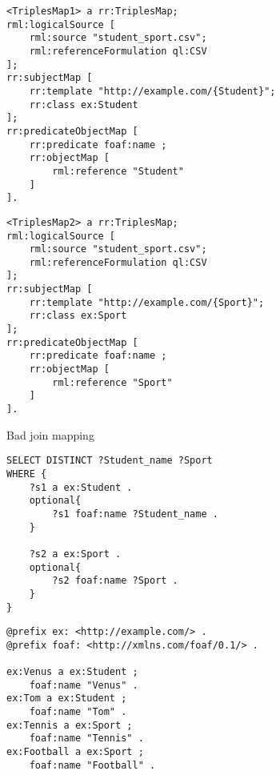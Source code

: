 \begin{listing}
    \noindent\begin{minipage}[b]{.45\textwidth}
        \begin{lstlisting}[basicstyle=\small]
<TriplesMap1> a rr:TriplesMap;
rml:logicalSource [ 
    rml:source "student_sport.csv";
    rml:referenceFormulation ql:CSV
];
rr:subjectMap [ 
    rr:template "http://example.com/{Student}";
    rr:class ex:Student
];
rr:predicateObjectMap [ 
    rr:predicate foaf:name ; 
    rr:objectMap [ 
        rml:reference "Student"
    ]
].
        \end{lstlisting}      
    \end{minipage}
    \hfill
    \begin{minipage}[b]{.45\textwidth}
        \begin{lstlisting}[basicstyle=\small]
<TriplesMap2> a rr:TriplesMap;
rml:logicalSource [ 
    rml:source "student_sport.csv";
    rml:referenceFormulation ql:CSV
];
rr:subjectMap [ 
    rr:template "http://example.com/{Sport}";
    rr:class ex:Sport
];
rr:predicateObjectMap [ 
    rr:predicate foaf:name ; 
    rr:objectMap [ 
        rml:reference "Sport"
    ]
].
        \end{lstlisting}
    \end{minipage}
    \addtocounter{listing}{5}
    \caption{Bad join mapping}
    \label{lst:bad_join_example}
\end{listing}

\begin{lstlisting}[caption={Bad join query (trimmed)}, label={lst:bad_join_query}, captionpos=b, basicstyle=\small]
SELECT DISTINCT ?Student_name ?Sport
WHERE {
    ?s1 a ex:Student .
    optional{
        ?s1 foaf:name ?Student_name .
    }

    ?s2 a ex:Sport .
    optional{
        ?s2 foaf:name ?Sport .
    }
}
\end{lstlisting}

\begin{lstlisting}[caption={Bad join knowledge graph}, label={lst:bad_join_kg}, captionpos=b, basicstyle=\small]
@prefix ex: <http://example.com/> .
@prefix foaf: <http://xmlns.com/foaf/0.1/> .

ex:Venus a ex:Student ;
    foaf:name "Venus" .
ex:Tom a ex:Student ;
    foaf:name "Tom" .
ex:Tennis a ex:Sport ;
    foaf:name "Tennis" .
ex:Football a ex:Sport ;
    foaf:name "Football" .
\end{lstlisting}

